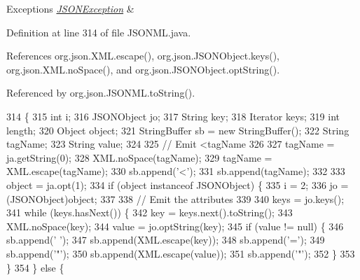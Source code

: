 \begin{DoxyExceptions}{Exceptions}
{\em \hyperlink{classorg_1_1json_1_1_j_s_o_n_exception}{J\-S\-O\-N\-Exception}} & \\
\hline
\end{DoxyExceptions}


Definition at line 314 of file J\-S\-O\-N\-M\-L.\-java.



References org.\-json.\-X\-M\-L.\-escape(), org.\-json.\-J\-S\-O\-N\-Object.\-keys(), org.\-json.\-X\-M\-L.\-no\-Space(), and org.\-json.\-J\-S\-O\-N\-Object.\-opt\-String().



Referenced by org.\-json.\-J\-S\-O\-N\-M\-L.\-to\-String().


\begin{DoxyCode}
314                                                                      \{
315         \textcolor{keywordtype}{int}             i;
316         JSONObject   jo;
317         String       key;
318         Iterator     keys;
319         \textcolor{keywordtype}{int}             length;
320         Object         object;
321         StringBuffer sb = \textcolor{keyword}{new} StringBuffer();
322         String       tagName;
323         String       value;
324 
325 \textcolor{comment}{// Emit <tagName}
326 
327         tagName = ja.getString(0);
328         XML.noSpace(tagName);
329         tagName = XML.escape(tagName);
330         sb.append(\textcolor{charliteral}{'<'});
331         sb.append(tagName);
332 
333         \textcolor{keywordtype}{object} = ja.opt(1);
334         \textcolor{keywordflow}{if} (\textcolor{keywordtype}{object} instanceof JSONObject) \{
335             i = 2;
336             jo = (JSONObject)\textcolor{keywordtype}{object};
337 
338 \textcolor{comment}{// Emit the attributes}
339 
340             keys = jo.keys();
341             \textcolor{keywordflow}{while} (keys.hasNext()) \{
342                 key = keys.next().toString();
343                 XML.noSpace(key);
344                 value = jo.optString(key);
345                 \textcolor{keywordflow}{if} (value != null) \{
346                     sb.append(\textcolor{charliteral}{' '});
347                     sb.append(XML.escape(key));
348                     sb.append(\textcolor{charliteral}{'='});
349                     sb.append(\textcolor{charliteral}{'"'});
350                     sb.append(XML.escape(value));
351                     sb.append(\textcolor{charliteral}{'"'});
352                 \}
353             \}
354         \} \textcolor{keywordflow}{else} \{

\end{DoxyCode}
